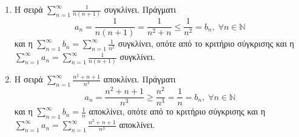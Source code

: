 \documentclass[main.tex]{subfiles}
\begin{document}
\begin{examples}
\item {}
\begin{enumerate}
    \item Η σειρά $ \sum_{n=1}^{\infty} \frac{1}{n(n+1)} $ συγκλίνει. Πράγματι
        \[
            a_{n}= \frac{1}{n(n+1)} = \frac{1}{n^{2}+n} \leq \frac{1}{n^{2}} = 
            b_{n}, \; \forall n \in \mathbb{N}
         \] 
         και η $ \sum_{n=1}^{\infty} b_{n} = \sum_{n=1}^{\infty} \frac{1}{n^{2}} $ 
         συγκλίνει, οπότε από το κριτήριο 
         σύγκρισης και η $ \sum_{n=1}^{\infty} a_{n} = \sum_{n=1}^{\infty} 
         \frac{1}{n(n+1)} $ συγκλίνει. 

     \item Η σειρά $ \sum_{n=1}^{\infty} \frac{n^{2}+n+1}{n^{3}} $ αποκλίνει. Πράγματι
         \[
             a_{n} = \frac{n^{2}+n+1}{n^{3}} \geq \frac{n^{2}}{n^{3}} = \frac{1}{n} = 
             b_{n}, \; \forall n \in \mathbb{N} 
          \] 
          και η $ \sum_{n=1}^{\infty} b_{n} = \frac{1}{n} $ αποκλίνει, οπότε από 
          το κριτήριο σύγκρισης και η $ \sum_{n=1}^{\infty} a_{n} = 
          \sum_{n=1}^{\infty} \frac{n^{2}+n+1}{n^{3}} $ αποκλίνει.
\end{enumerate}
\end{examples}
\end{document}
